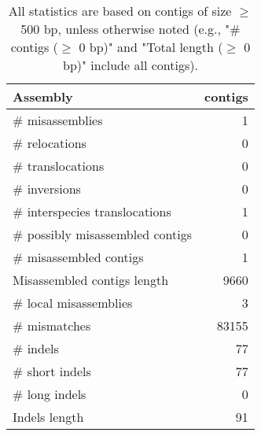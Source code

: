 \documentclass[12pt,a4paper]{article}
\begin{document}
\begin{table}[ht]
\begin{center}
\caption{All statistics are based on contigs of size $\geq$ 500 bp, unless otherwise noted (e.g., "\# contigs ($\geq$ 0 bp)" and "Total length ($\geq$ 0 bp)" include all contigs).}
\begin{tabular}{|l*{1}{|r}|}
\hline
Assembly & contigs \\ \hline
\# misassemblies & 1 \\ \hline
\hspace{5mm}\# relocations & 0 \\ \hline
\hspace{5mm}\# translocations & 0 \\ \hline
\hspace{5mm}\# inversions & 0 \\ \hline
\hspace{5mm}\# interspecies translocations & 1 \\ \hline
\# possibly misassembled contigs & 0 \\ \hline
\# misassembled contigs & 1 \\ \hline
Misassembled contigs length & 9660 \\ \hline
\# local misassemblies & 3 \\ \hline
\# mismatches & 83155 \\ \hline
\# indels & 77 \\ \hline
\hspace{5mm}\# short indels & 77 \\ \hline
\hspace{5mm}\# long indels & 0 \\ \hline
Indels length & 91 \\ \hline
\end{tabular}
\end{center}
\end{table}
\end{document}
